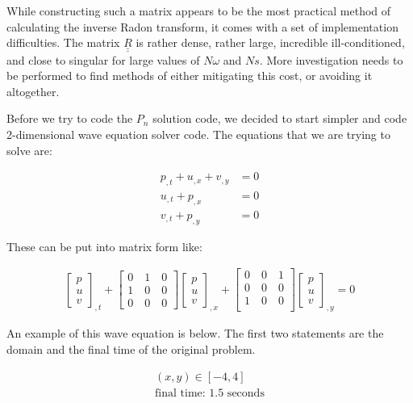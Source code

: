 \documentclass[12pt]{article}
\newcommand{\bunderline}[1]{\underline{#1}}
\newcommand{\mat}[1]{{\bunderline{\bunderline{#1}}}}
\begin{document}
While constructing such a matrix appears to be the most practical method of calculating the inverse Radon transform, it comes with a set of implementation difficulties.
The matrix $\mat{R}$ is rather dense, rather large, incredible ill-conditioned, and close to singular for large values of $N\omega$ and $Ns$.
More investigation needs to be performed to find methods of either mitigating this cost, or avoiding it altogether.

Before we try to code the $P_n$ solution code, we decided to start simpler and code 2-dimensional wave equation solver code. The equations that we are trying to solve are:

\begin{align*}
p_{,t} + u_{,x} + v_{,y} &= 0 \\
u_{,t} + p_{,x} &= 0 \\
v_{,t} + p_{,y} &= 0
\end{align*}

These can be put into matrix form like:

\begin{align*}
\begin{bmatrix}
p \\
u \\
v
\end{bmatrix}
_{,t}
+
\begin{bmatrix}
0\quad1\quad0 \\
1\quad0\quad0 \\
0\quad0\quad0
\end{bmatrix}
\begin{bmatrix}
p \\
u \\
v
\end{bmatrix}
_{,x}
+
\begin{bmatrix}
0\quad0\quad1 \\
0\quad0\quad0 \\
1\quad0\quad0 \\
\end{bmatrix}
\begin{bmatrix}
p \\
u \\
v
\end{bmatrix}
_{,y}
= 0
\end{align*}

An example of this wave equation is below. The first two statements are the domain and the final time of the original problem.

\begin{align*}
(x, y) \in [-4, 4] \\
\text{final time: 1.5 seconds}
\end{align*}
\end{document}
